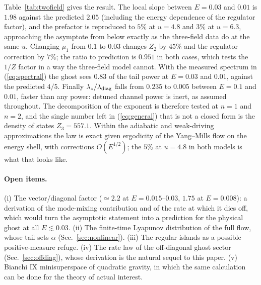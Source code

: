 Table~\ref{tab:twofield} gives the result. The local slope between $E=0.03$ and $0.01$ is
$1.98$ against the predicted $2.05$ (including the energy dependence of the regulator factor),
and the prefactor is reproduced to $5\%$ at $u=4.8$ and $3\%$ at $u=6.3$, approaching the
asymptote from below exactly as the three-field data do at the same $u$. Changing $\mu_1$ from
$0.1$ to $0.03$ changes $Z_2$ by $45\%$ and the regulator correction by $7\%$; the ratio to
prediction is $0.951$ in both cases, which tests the $1/Z$ factor in a way the three-field model
cannot. With the measured spectrum in (\ref{eq:spectral}) the ghost sees $0.83$ of the tail
power at $E=0.03$ and $0.01$, against the predicted $4/5$. Finally $\lambda_z/\lambda_{\rm diag}$
falls from $0.235$ to $0.005$ between $E=0.1$ and $0.01$, faster than any power: detuned
channel power is inert, as assumed throughout. The decomposition of the exponent is therefore
tested at $n=1$ and $n=2$, and the single number left in (\ref{eq:general}) that is not a closed
form is the density of states $Z_3=557.1$. Within the adiabatic and weak-driving approximations
the law is exact given ergodicity of the Yang--Mills flow on the energy shell, with corrections
$O(E^{1/2})$; the $5\%$ at $u=4.8$ in both models is what that looks like.


\paragraph{Open items.} (i) The vector/diagonal factor ($\simeq2.2$ at $E=0.015$--$0.03$,
$1.75$ at $E=0.008$): a derivation of the mode-mixing contribution and of the rate at which it
dies off, which would turn the asymptotic statement into a prediction for the physical ghost at
all $E\lesssim0.03$. (ii) The finite-time Lyapunov distribution of the full flow,
whose tail sets $\alpha$ (Sec.~\ref{sec:nonlinear}). (iii) The regular islands as a possible
positive-measure refuge. (iv) The rate law of the off-diagonal ghost sector
(Sec.~\ref{sec:offdiag}), whose derivation is the natural sequel to this paper. (v) Bianchi IX
minisuperspace of quadratic gravity, in which the same calculation can be done for the theory of
actual interest.


